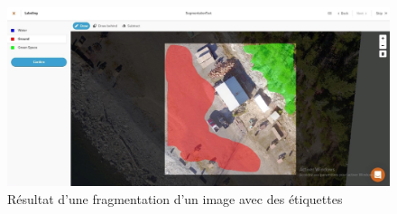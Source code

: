 \documentclass[12pt, openany]{report}
\begin{document}
\begin{figure}[h]
\centering
\includegraphics[scale=0.4]{groundwork_screen2.jpg}
\caption{Résultat d'une fragmentation d'un image avec des étiquettes}
\end{figure}
\end{document}
